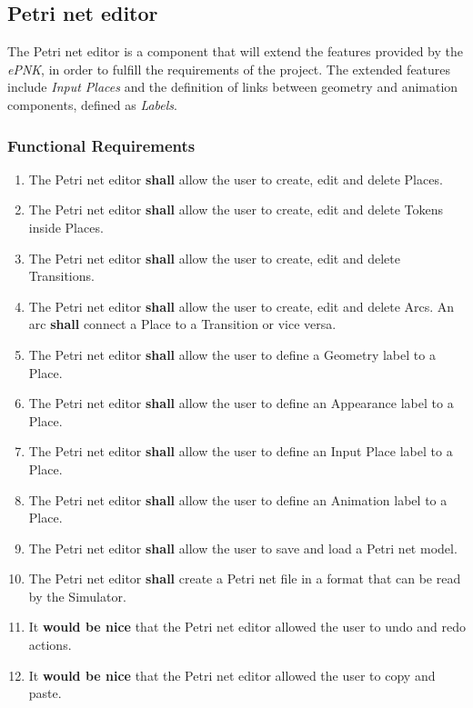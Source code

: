 \subsection{Petri net editor}
\label{sec:sf-petrinet}

The Petri net editor is a component that will extend the features provided by the \textit{ePNK}, in order to fulfill the requirements of the project. The extended features include \textit{Input Places} and the definition of links between geometry and animation components, defined as \textit{Labels}.

\subsubsection{Functional Requirements}

\begin{enumerate}
	\item The Petri net editor \textbf{shall} allow the user to create, edit and delete Places.
	\item The Petri net editor \textbf{shall} allow the user to create, edit and delete Tokens inside Places.
	\item The Petri net editor \textbf{shall} allow the user to create, edit and delete Transitions.
	\item The Petri net editor \textbf{shall} allow the user to create, edit and delete Arcs. An arc \textbf{shall} connect a Place to a Transition or vice versa.
	\item The Petri net editor \textbf{shall} allow the user to define a Geometry label to a Place.
	\item The Petri net editor \textbf{shall} allow the user to define an Appearance label to a Place.
	\item The Petri net editor \textbf{shall} allow the user to define an Input Place label to a Place.
	\item The Petri net editor \textbf{shall} allow the user to define an Animation label to a Place.
	\item The Petri net editor \textbf{shall} allow the user to save and load a Petri net model.
	\item The Petri net editor \textbf{shall} create a Petri net file in a format that can be read by the Simulator.
	\item It \textbf{would be nice} that the Petri net editor allowed the user to undo and redo actions.
	\item It \textbf{would be nice} that the Petri net editor allowed the user to copy and paste.
\end{enumerate}

